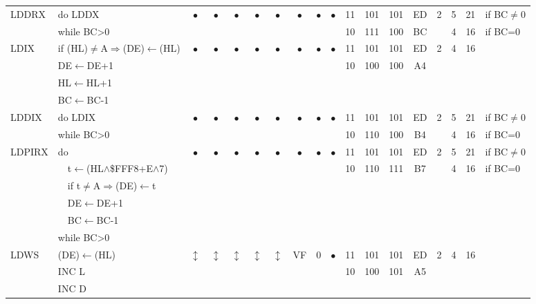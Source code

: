 \documentclass[oneside,a4paper]{book}
\newcommand{\instrt}{\rule{0pt}{2.7ex}}
\newcommand{\instrb}{\rule[-1.7ex]{0pt}{0pt}}
\begin{document}
{\begin{tabular}{llcccccccccccccccl}
		LDDRX\instrt & 
			do LDDX & 
			$\bullet$ & 
				$\bullet$ & 
				$\bullet$ & 
				$\bullet$ & 
				$\bullet$ & 
				$\bullet$ & 
				$\bullet$ & 
				$\bullet$ & 
			11 & 101 & 101 & 
			ED & 2 & 
			5 & 21 & if BC$\neq$0 \\
			& while BC>0 & \multicolumn{8}{c}{} & 10 & 111 & 100 & BC & & 4 & 16 & if BC=0 \instrb \\
	
		LDIX\instrt & 
			if (HL)$\neq$A$\Rightarrow$(DE)$\leftarrow$(HL) & 
			$\bullet$ & 
				$\bullet$ & 
				$\bullet$ & 
				$\bullet$ & 
				$\bullet$ & 
				$\bullet$ & 
				$\bullet$ & 
				$\bullet$ & 
			11 & 101 & 101 & 
			ED & 2 &
			4 & 16 & \\
			& DE$\leftarrow$DE+1 & \multicolumn{8}{c}{} & 10 & 100 & 100 & A4 & \\
			& HL$\leftarrow$HL+1 & \\
			& BC$\leftarrow$BC-1 & \instrb \\
	
		LDDIX\instrt & 
			do LDIX & 
			$\bullet$ & 
				$\bullet$ & 
				$\bullet$ & 
				$\bullet$ & 
				$\bullet$ & 
				$\bullet$ & 
				$\bullet$ & 
				$\bullet$ & 
			11 & 101 & 101 & 
			ED & 2 & 
			5 & 21 & if BC$\neq$0 \\
			& while BC>0 & \multicolumn{8}{c}{} & 10 & 110 & 100 & B4 & & 4 & 16 & if BC=0 \instrb \\
	
		LDPIRX\instrt & 
			do & 
			$\bullet$ & 
				$\bullet$ & 
				$\bullet$ & 
				$\bullet$ & 
				$\bullet$ & 
				$\bullet$ & 
				$\bullet$ & 
				$\bullet$ & 
			11 & 101 & 101 & 
			ED & 2 &
			5 & 21 & if BC$\neq$0 \\
			& ~~t$\leftarrow$(HL$\wedge$\$FFF8+E$\wedge$7) & \multicolumn{8}{c}{} & 10 & 110 & 111 & B7 & & 4 & 16 & if BC=0 \\
			& ~~if t$\neq$A$\Rightarrow$(DE)$\leftarrow$t & \\
			& ~~DE$\leftarrow$DE+1 & \\
			& ~~BC$\leftarrow$BC-1 & \\
			& while BC>0 & \instrb \\
	
		LDWS\instrt & 
			(DE)$\leftarrow$(HL) & 
			$\updownarrow$ & 
				$\updownarrow$ & 
				$\updownarrow$ & 
				$\updownarrow$ & 
				$\updownarrow$ & 
				VF & 
				0 & 
				$\bullet$ & 
			11 & 101 & 101 & 
			ED & 2 &
			4 & 16 & \\
			& INC L & \multicolumn{8}{c}{} & 10 & 100 & 101 & A5 & \\
			& INC D & \instrb \\


\end{tabular}}
\end{document}
